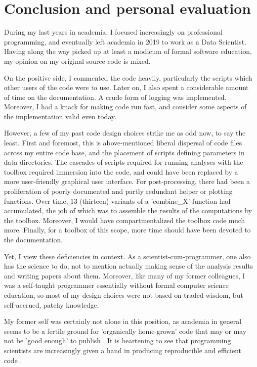 \section{Conclusion and personal evaluation}
During my last years in academia, I focused increasingly on professional programming, and eventually left academia in 2019 to work as a Data Scientist. Having along the way picked up at least a modicum of formal software education, my opinion on my original source code is mixed. 

On the positive side, I commented the code heavily, particularly the scripts which other users of the code were to use. Later on, I also spent a considerable amount of time on the documentation. A crude form of logging was implemented. Moreover, I had a knack for making code run fast, and consider some aspects of the implementation valid even today.

However, a few of my past code design choices strike me as odd now, to say the least. First and foremost, this is above-mentioned liberal dispersal of code files across my entire code base, and the placement of scripts defining parameters in data directories. The cascades of scripts required for running analyses with the toolbox required immersion into the code, and could have been replaced by a more user-friendly graphical user interface. For post-processing, there had been a proliferation of poorly documented and partly redundant helper or plotting functions. Over time, 13 (thirteen) variants of a 'combine\_X'-function had accumulated, the job of which was to assemble the results of the computations by the toolbox. Moreover, I would have compartmentalized the toolbox code much more. Finally, for a toolbox of this scope, more time should have been devoted to the documentation.

Yet, I view these deficiencies in context. As a scientist-cum-programmer, one also has the science to do, not to mention actually making sense of the analysis results and writing papers about them. Moreover, like many of my former colleagues, I was a self-taught programmer essentially without formal computer science education, so most of my design choices were not based on traded wisdom, but self-accrued, patchy knowledge. 

My former self was certainly not alone in this position, as academia in general seems to be a fertile ground for 'organically home-grown' code that may or may not be 'good enough' to publish \cite{barnes_publish_2010}. It is heartening to see that programming scientists are increasingly given a hand in producing reproducible and efficient code \cite{wilson_good_2017}.

